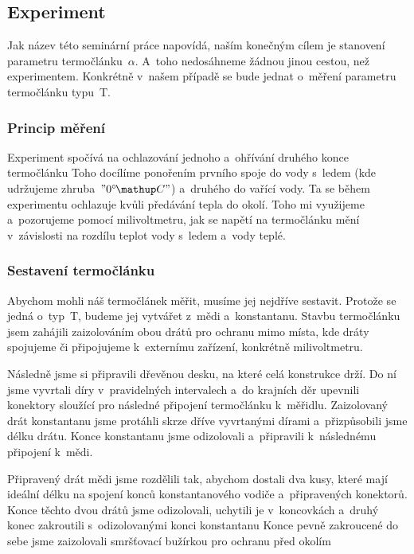 \subsection{Experiment}
Jak název této seminární práce napovídá, naším konečným cílem je stanovení
parametru termočlánku~$\alpha$. A~toho nedosáhneme žádnou jinou cestou, než
experimentem. Konkrétně v~našem případě se bude jednat o~měření parametru
termočlánku typu~T.

\subsubsection{Princip měření}
Experiment spočívá na ochlazování jednoho a~ohřívání druhého konce termočlánku%
 Toho docílíme ponořením prvního
spoje do vody s~ledem (kde udržujeme zhruba~$"0\C"$) a~druhého do vařící vody.
Ta se během experimentu ochlazuje kvůli předávání tepla do okolí. Toho mi
využijeme a~pozorujeme pomocí milivoltmetru, jak se napětí na termočlánku
mění v~závislosti na rozdílu teplot vody s~ledem a~vody teplé.

\subsubsection{Sestavení termočlánku}
Abychom mohli náš termočlánek měřit, musíme jej nejdříve sestavit. Protože se
jedná o~typ~T, budeme jej vytvářet z~mědi a~konstantanu. Stavbu termočlánku
jsem zahájili zaizolováním obou drátů pro ochranu mimo místa, kde dráty spojujeme
či připojujeme k~externímu zařízení, konkrétně milivoltmetru.

Následně jsme si připravili dřevěnou desku, na které celá konstrukce drží.
Do ní jsme vyvrtali díry v~pravidelných intervalech a~do krajních děr upevnili
konektory sloužící pro následné připojení termočlánku k~měřidlu. Zaizolovaný
drát konstantanu jsme protáhli skrze dříve vyvrtanými dírami a~přizpůsobili
jsme délku drátu. Konce konstantanu jsme odizolovali a~připravili k~následnému
připojení k~mědi.

Připravený drát mědi jsme rozdělili tak, abychom dostali dva kusy, které mají
ideální délku na spojení konců konstantanového vodiče a~připravených konektorů.
Konce těchto dvou drátů jsme odizolovali, uchytili je v~koncovkách a~druhý
konec zakroutili s~odizolovanými konci konstantanu%
Konce pevně zakroucené do sebe jsme zaizolovali smršťovací bužírkou pro ochranu
před okolím

